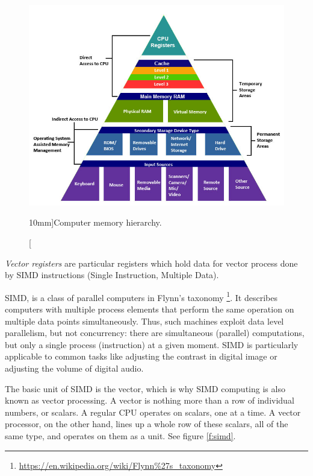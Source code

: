 \begin{figure}\label{f:memory-hierarchy}
	\begin{center}
		\includegraphics[width=1.\textwidth]{graphics/gi/path-15}
	\end{center}
	\caption[][10mm]{Computer memory hierarchy.}
\end{figure}

\textit{Vector registers} are particular registers which hold data for vector process done by SIMD instructions (Single Instruction, Multiple Data).

SIMD, is a class of parallel computers in Flynn's taxonomy \footnote{\url{https://en.wikipedia.org/wiki/Flynn\%27s\_taxonomy}}. It describes computers with multiple process elements that perform the same operation on multiple data points simultaneously. Thus, such machines exploit data level parallelism, but not concurrency: there are simultaneous (parallel) computations, but only a single process (instruction) at a given moment. SIMD is particularly applicable to common tasks like adjusting the contrast in digital image or adjusting the volume of digital audio. 

The basic unit of SIMD is the vector, which is why SIMD computing is also known as vector processing. A vector is nothing more than a row of individual numbers, or scalars. A regular CPU operates on scalars, one at a time. A vector processor, on the other hand, lines up a whole row of these scalars, all of the same type, and operates on them as a unit. See figure \ref{f:simd}.

